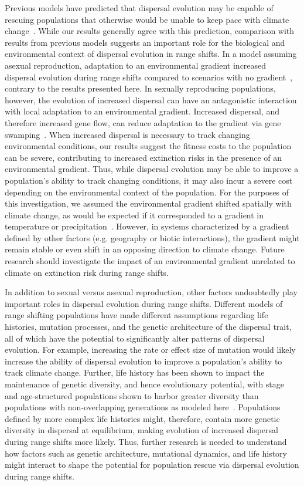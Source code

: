 \documentclass[11pt]{article}
\begin{document}
Previous models have predicted that dispersal evolution may be capable of rescuing populations that otherwise would be unable to keep pace with climate change~\citep{boeye2013more, henry2013eco}. While our results generally agree with this prediction, comparison with results from previous models suggests an important role for the biological and environmental context of dispersal evolution in range shifts. In a model assuming asexual reproduction, adaptation to an environmental gradient increased dispersal evolution during range shifts compared to scenarios with no gradient~\citep{hargreaves2015fitness}, contrary to the results presented here. In sexually reproducing populations, however, the evolution of increased dispersal can have an antagonistic interaction with local adaptation to an environmental gradient. Increased dispersal, and therefore increased gene flow, can reduce adaptation to the gradient via gene swamping~\citep{lenormand2002gene, kirkpatrick1997evolution}. When increased dispersal is necessary to track changing environmental conditions, our results suggest the fitness costs to the population can be severe, contributing to increased extinction risks in the presence of an environmental gradient. Thus, while dispersal evolution may be able to improve a population's ability to track changing conditions, it may also incur a severe cost depending on the environmental context of the population. For the purposes of this investigation, we assumed the environmental gradient shifted spatially with climate change, as would be expected if it corresponded to a gradient in temperature or precipitation~\citep{davis2001range}. However, in systems characterized by a gradient defined by other factors (e.g. geography or biotic interactions), the gradient might remain stable or even shift in an opposing direction to climate change. Future research should investigate the impact of an environmental gradient unrelated to climate on extinction risk during range shifts.

In addition to sexual versus asexual reproduction, other factors undoubtedly play important roles in dispersal evolution during range shifts. Different models of range shifting populations have made different assumptions regarding life histories, mutation processes, and the genetic architecture of the dispersal trait, all of which have the potential to significantly alter patterns of dispersal evolution. For example, increasing the rate or effect size of mutation would likely increase the ability of dispersal evolution to improve a population's ability to track climate change. Further, life history has been shown to impact the maintenance of genetic diversity, and hence evolutionary potential, with stage and age-structured populations shown to harbor greater diversity than populations with non-overlapping generations as modeled here~\citep{ellner1996environmental}. Populations defined by more complex life histories might, therefore, contain more genetic diversity in dispersal at equilibrium, making evolution of increased dispersal during range shifts more likely. Thus, further research is needed to understand how factors such as genetic architecture, mutational dynamics, and life history might interact to shape the potential for population rescue via dispersal evolution during range shifts.
\end{document}
